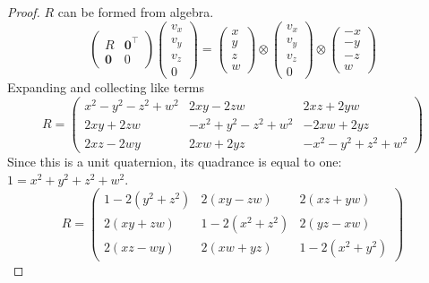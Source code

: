 \documentclass{amsart}
\theoremstyle{definition}
\theoremstyle{remark}
\numberwithin{equation}{section}
\begin{document}
\begin{proof}
  $R$ can be formed from algebra.
  \begin{equation}
    \begin{pmatrix}
      R & \mathbf{0}^\top \\
      \mathbf{0} & 0
    \end{pmatrix}
    \begin{pmatrix}
      v_x \\
      v_y \\
      v_z \\
      0
    \end{pmatrix}
    =
    \begin{pmatrix}
      x \\
      y \\
      z \\
      w
    \end{pmatrix} \otimes
    \begin{pmatrix}
      v_x \\
      v_y \\
      v_z \\
      0
    \end{pmatrix}
    \otimes
    \begin{pmatrix}
      -x \\
      -y \\
      -z \\
      w
    \end{pmatrix} \nonumber
  \end{equation}
  Expanding and collecting like terms
  \begin{equation}
    R =
    \begin{pmatrix}
      x^2-y^2-z^2+w^2 & 2xy-2zw & 2xz+2yw \\
      2xy+2zw & -x^2+y^2-z^2+w^2 & -2xw+2yz \\
      2xz-2wy & 2xw+2yz & -x^2-y^2+z^2+w^2
    \end{pmatrix} \nonumber
  \end{equation}
  Since this is a unit quaternion, its quadrance is equal to one: $1=x^2+y^2+z^2+w^2$.
  \begin{equation}
    R =
    \begin{pmatrix}
      1-2(y^2+z^2) & 2(xy-zw) & 2(xz+yw) \\
      2(xy+zw) & 1-2(x^2+z^2) & 2(yz-xw) \\
      2(xz-wy) & 2(xw+yz) & 1-2(x^2+y^2)
    \end{pmatrix} \nonumber
  \end{equation}
\end{proof}
\end{document}
